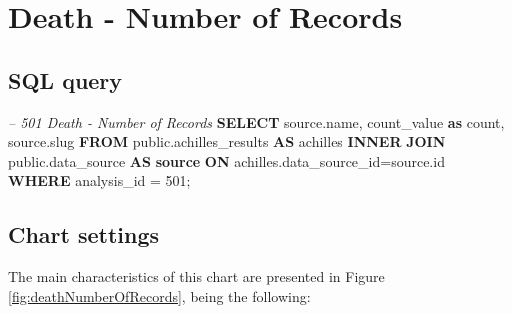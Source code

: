 \documentclass[]{book}
\newenvironment{Shaded}{\begin{snugshade}}{\end{snugshade}}
\newcommand{\KeywordTok}[1]{\textcolor[rgb]{0.13,0.29,0.53}{\textbf{#1}}}
\newcommand{\DecValTok}[1]{\textcolor[rgb]{0.00,0.00,0.81}{#1}}
\newcommand{\CommentTok}[1]{\textcolor[rgb]{0.56,0.35,0.01}{\textit{#1}}}
\newcommand{\FunctionTok}[1]{\textcolor[rgb]{0.00,0.00,0.00}{#1}}
\newcommand{\NormalTok}[1]{#1}
\begin{document}
\section{Death - Number of Records}\label{death---number-of-records}

\subsection{SQL query}\label{sql-query-15}

\begin{Shaded}
\begin{Highlighting}[]
\CommentTok{-- 501  Death - Number of Records}
\KeywordTok{SELECT}\NormalTok{ source.name,}
\NormalTok{       count_value }\KeywordTok{as} \FunctionTok{count}\NormalTok{, }
\NormalTok{       source.slug}
\KeywordTok{FROM}\NormalTok{ public.achilles_results }\KeywordTok{AS}\NormalTok{ achilles }
    \KeywordTok{INNER} \KeywordTok{JOIN}\NormalTok{ public.data_source }\KeywordTok{AS} \KeywordTok{source} \KeywordTok{ON} 
\NormalTok{      achilles.data_source_id=source.id}
\KeywordTok{WHERE}\NormalTok{ analysis_id = }\DecValTok{501}\NormalTok{;}
\end{Highlighting}
\end{Shaded}

\subsection{Chart settings}\label{chart-settings-15}

The main characteristics of this chart are presented in Figure
\ref{fig:deathNumberOfRecords}, being the following:
\end{document}
